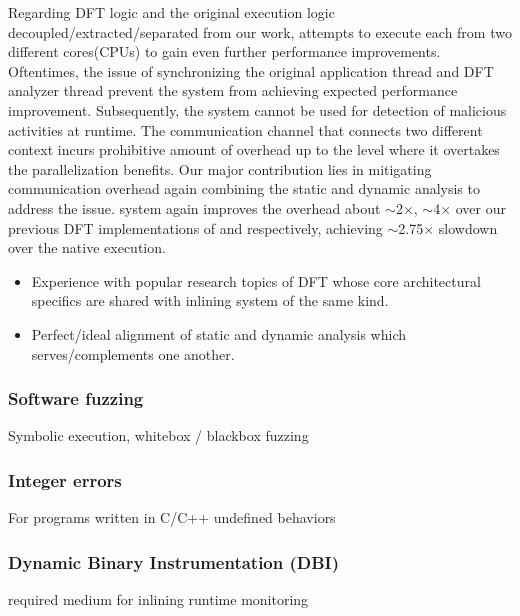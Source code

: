 \documentclass[letterpaper, 10pt]{article}
\begin{document}
\begin{small}
Regarding DFT logic and the original execution logic
decoupled/extracted/separated from our \TFA work, \SR attempts to execute each
from two different cores(CPUs) to gain even further performance improvements.
Oftentimes, the issue of synchronizing the original application thread and DFT
analyzer thread prevent the system from achieving expected performance
improvement. Subsequently, the system cannot be used for detection of malicious
activities at runtime.
%
The communication channel that connects two different context incurs
prohibitive amount of overhead up to the level where it overtakes the
parallelization benefits. Our major contribution lies in mitigating
communication overhead again combining the static and dynamic analysis to
address the issue.
%
\SR system again improves the overhead about $\sim$2$\times$, $\sim$4$\times$
over our previous DFT implementations of \TFA and \libdft respectively,
achieving $\sim$2.75$\times$ slowdown over the native execution. 
\begin{itemize}
    \item Experience with popular research topics of DFT whose core architectural specifics are shared with inlining system of the same kind. 
    \item Perfect/ideal alignment of static and dynamic analysis which serves/complements one another.
\end{itemize}

\subsubsection*{Software fuzzing}
Symbolic execution, whitebox / blackbox fuzzing

\subsubsection*{Integer errors}
For programs written in C/C++ undefined behaviors

\subsubsection*{Dynamic Binary Instrumentation (DBI)}
required medium for inlining runtime monitoring 


\end{small}
\end{document}
